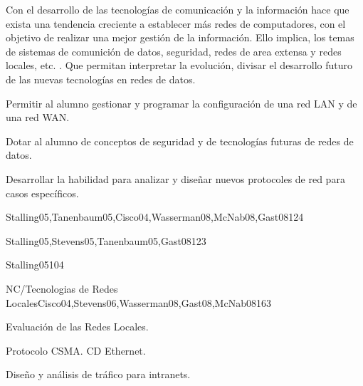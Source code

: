 \begin{syllabus}


\begin{justification}
Con el desarrollo de las tecnologías de comunicación   y la información
 hace que exista una tendencia creciente a  establecer  más redes de
 computadores,  con el objetivo de realizar una mejor gestión de la
 información.  Ello implica, los temas de sistemas de comunición de  datos,
  seguridad, redes de area extensa  y redes  locales, etc.  . Que permitan
  interpretar la  evolución, divisar  el desarrollo  futuro de las
  nuevas  tecnologías en redes de datos.
\end{justification}

\begin{goals}
\item Permitir al alumno gestionar y programar la configuración de una red LAN y de una red WAN.
\item Dotar al alumno de conceptos de seguridad y de tecnologías futuras de redes de datos.
\item Desarrollar la habilidad para analizar y diseñar nuevos protocoles de red para casos específicos.
\end{goals}

\begin{outcomes}
\end{outcomes}

\begin{unit}{\NCIntroductionDef}{Stalling05,Tanenbaum05,Cisco04,Wasserman08,McNab08,Gast08}{12}{4}
   \NCIntroductionAllTopics
   \NCIntroductionAllObjectives
\end{unit}

\begin{unit}{\NCNetworkCommunicationDef}{Stalling05,Stevens05,Tanenbaum05,Gast08}{12}{3}
   \NCNetworkCommunicationAllTopics
   \NCNetworkCommunicationAllObjectives
\end{unit}

\begin{unit}{\NCCompressionDef}{Stalling05}{10}{4}
	\NCCompressionAllTopics
	\NCCompressionAllObjectives
\end{unit}

\begin{unit}{NC/Tecnologias de Redes Locales}{Cisco04,Stevens06,Wasserman08,Gast08,McNab08}{16}{3}
   \begin{topics}
      \item Evaluación de las  Redes  Locales.
      \item Protocolo CSMA. CD Ethernet.
      \item Diseño y  análisis de  tráfico para intranets.
   \end{topics}


\end{unit}
\end{syllabus}
